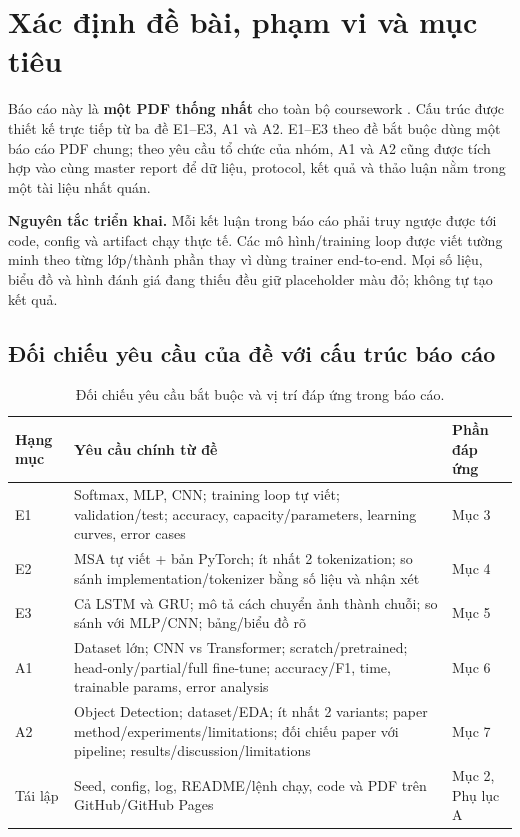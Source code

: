 \section{Xác định đề bài, phạm vi và mục tiêu}

Báo cáo này là \textbf{một PDF thống nhất} cho toàn bộ coursework \CourseCode. Cấu trúc được thiết kế trực tiếp từ ba đề E1--E3, A1 và A2. E1--E3 theo đề bắt buộc dùng một báo cáo PDF chung; theo yêu cầu tổ chức của nhóm, A1 và A2 cũng được tích hợp vào cùng master report để dữ liệu, protocol, kết quả và thảo luận nằm trong một tài liệu nhất quán.

\begin{objectivebox}
\textbf{Nguyên tắc triển khai.} Mỗi kết luận trong báo cáo phải truy ngược được tới code, config và artifact chạy thực tế. Các mô hình/training loop được viết tường minh theo từng lớp/thành phần thay vì dùng trainer end-to-end. Mọi số liệu, biểu đồ và hình đánh giá đang thiếu đều giữ placeholder màu đỏ; không tự tạo kết quả.
\end{objectivebox}

\subsection{Đối chiếu yêu cầu của đề với cấu trúc báo cáo}
\begin{table}[H]\centering
\caption{Đối chiếu yêu cầu bắt buộc và vị trí đáp ứng trong báo cáo.}
\begin{tabularx}{\textwidth}{@{}p{}X X@{}}
\toprule
Hạng mục & Yêu cầu chính từ đề & Phần đáp ứng \\
\midrule
E1 & Softmax, MLP, CNN; training loop tự viết; validation/test; accuracy, capacity/parameters, learning curves, error cases & Mục 3 \\
E2 & MSA tự viết + bản PyTorch; ít nhất 2 tokenization; so sánh implementation/tokenizer bằng số liệu và nhận xét & Mục 4 \\
E3 & Cả LSTM và GRU; mô tả cách chuyển ảnh thành chuỗi; so sánh với MLP/CNN; bảng/biểu đồ rõ & Mục 5 \\
A1 & Dataset lớn; CNN vs Transformer; scratch/pretrained; head-only/partial/full fine-tune; accuracy/F1, time, trainable params, error analysis & Mục 6 \\
A2 & Object Detection; dataset/EDA; ít nhất 2 variants; paper method/experiments/limitations; đối chiếu paper với pipeline; results/discussion/limitations & Mục 7 \\
Tái lập & Seed, config, log, README/lệnh chạy, code và PDF trên GitHub/GitHub Pages & Mục 2, Phụ lục A \\
\bottomrule
\end{tabularx}
\end{table}

